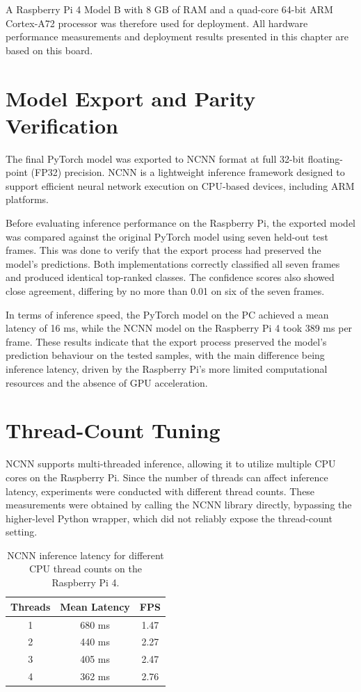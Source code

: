 \documentclass[12pt,a4paper]{report}
\begin{document}
A Raspberry Pi 4 Model B with 8 GB of RAM and a quad-core 64-bit ARM Cortex-A72 processor was therefore used for deployment. All hardware performance measurements and deployment results presented in this chapter are based on this board.

\section{Model Export and Parity Verification}

The final PyTorch model was exported to NCNN format at full 32-bit floating-point (FP32) precision. NCNN is a lightweight inference framework designed to support efficient neural network execution on CPU-based devices, including ARM platforms.

Before evaluating inference performance on the Raspberry Pi, the exported model was compared against the original PyTorch model using seven held-out test frames. This was done to verify that the export process had preserved the model's predictions. Both implementations correctly classified all seven frames and produced identical top-ranked classes. The confidence scores also showed close agreement, differing by no more than 0.01 on six of the seven frames.

In terms of inference speed, the PyTorch model on the PC achieved a mean latency of 16 ms, while the NCNN model on the Raspberry Pi 4 took 389 ms per frame. These results indicate that the export process preserved the model's prediction behaviour on the tested samples, with the main difference being inference latency, driven by the Raspberry Pi's more limited computational resources and the absence of GPU acceleration.

\section{Thread-Count Tuning}

NCNN supports multi-threaded inference, allowing it to utilize multiple CPU cores on the Raspberry Pi. Since the number of threads can affect inference latency, experiments were conducted with different thread counts. These measurements were obtained by calling the NCNN library directly, bypassing the higher-level Python wrapper, which did not reliably expose the thread-count setting.

\begin{table}[H]
    \centering
    \begin{tabular}{|c|c|c|}
        \hline
        \textbf{Threads} & \textbf{Mean Latency} & \textbf{FPS} \\
        \hline
        1 & 680 ms & 1.47 \\
        2 & 440 ms & 2.27 \\
        3 & 405 ms & 2.47 \\
        4 & 362 ms & 2.76 \\
        \hline
    \end{tabular}
    \caption{NCNN inference latency for different CPU thread counts on the Raspberry Pi 4.}
    \label{tab:ncnn-threads}
\end{table}
\end{document}
